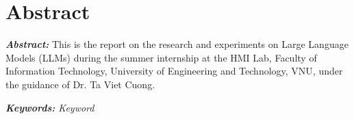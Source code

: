 \chapter*{Abstract}

\textit{\textbf{Abstract:}} This is the report on the research and experiments on Large Language Models (LLMs) during the summer internship at the HMI Lab, Faculty of Information Technology, University of Engineering and Technology, VNU, under the guidance of Dr. Ta Viet Cuong.
\begin{flushleft}
  \textit{\textbf{Keywords:} Keyword}
\end{flushleft}
\changefontsizes[16pt]{13pt}